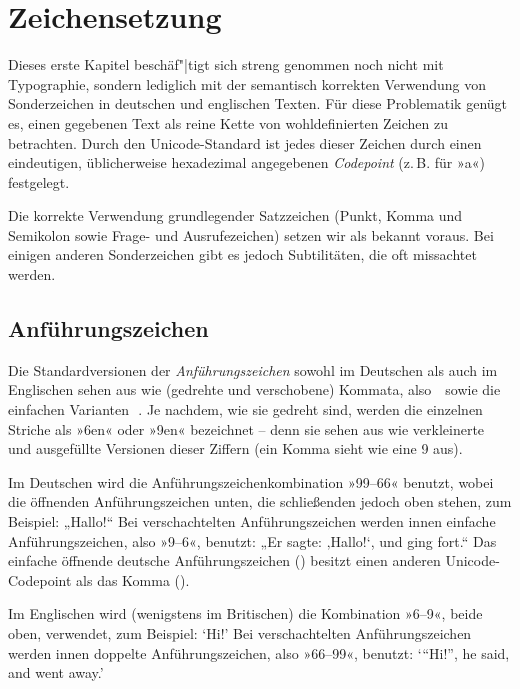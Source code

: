 \chapter{Zeichensetzung}

Dieses erste Kapitel beschäf"|tigt sich streng genommen noch nicht mit Typographie,
sondern lediglich mit der semantisch korrekten Verwendung von Sonderzeichen in
deutschen und englischen Texten. Für diese Problematik genügt es, einen gegebenen Text als
reine Kette von wohldefinierten Zeichen zu betrachten.  Durch den
Unicode-Standard ist jedes dieser Zeichen durch einen eindeutigen,
üblicherweise hexadezimal angegebenen \emph{Codepoint} (z.\,B. 
für »a«) festgelegt.

Die korrekte Verwendung grundlegender Satzzeichen (Punkt, Komma und Semikolon sowie
Frage- und Ausrufezeichen) setzen wir als bekannt voraus. Bei einigen
anderen Sonderzeichen gibt es jedoch Subtilitäten, die oft missachtet werden.

\section{Anführungszeichen}

Die Standardversionen der \emph{Anführungszeichen} sowohl im Deutschen als auch
im Englischen sehen aus wie (gedrehte und verschobene) Kommata, also
\,\, sowie die einfachen Varianten
\,\,.  Je nachdem, wie sie gedreht sind, werden die
einzelnen Striche als »6en« oder »9en« bezeichnet -- denn sie sehen
aus wie verkleinerte und ausgefüllte Versionen dieser Ziffern (ein Komma
\Char{,} sieht wie eine 9 aus).

Im Deutschen wird die Anführungszeichenkombination »99–66« benutzt, wobei die
öffnenden Anführungszeichen unten, die schließenden jedoch oben stehen, zum
Beispiel: „Hallo!“ Bei verschachtelten Anführungszeichen werden innen einfache
Anführungszeichen, also »9–6«, benutzt: „Er sagte: ‚Hallo!{‘}, und ging fort.“
Das einfache öffnende deutsche Anführungszeichen 
() besitzt einen anderen Unicode-Codepoint als das Komma \Char{,}
().

Im Englischen wird (wenigstens im Britischen) die Kombination »6–9«,
beide oben, verwendet, zum Beispiel: \foreignlanguage{british}{‘Hi!’}
Bei verschachtelten Anführungszeichen werden innen doppelte
Anführungszeichen, also »66–99«, benutzt:
\foreignlanguage{british}{‘“Hi!”, he said, and went away.’}

